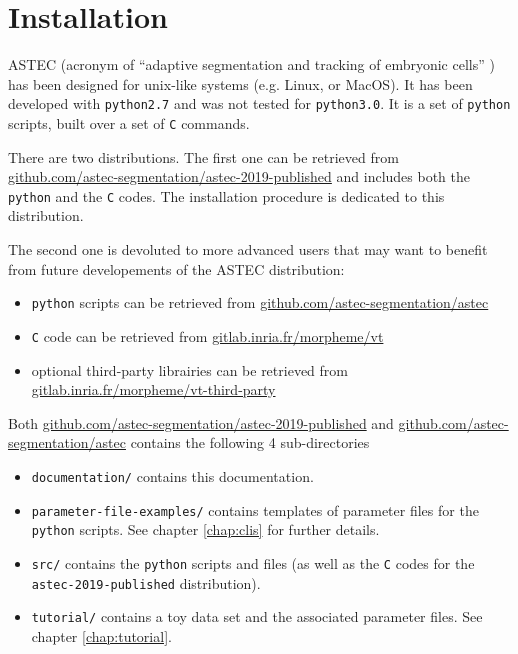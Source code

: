 
\chapter{Installation}

ASTEC (acronym of ``adaptive segmentation and tracking of embryonic
cells'' \cite{guignard:tel-01278725}) has been designed for unix-like
systems (e.g. Linux, or MacOS).
%
It has been developed with \texttt{python2.7} and was not tested for
\texttt{python3.0}.
%
It is a set of \texttt{python} scripts, built over a set of \texttt{C} commands.


There are two distributions. The first one can be retrieved from
\url{github.com/astec-segmentation/astec-2019-published} and includes
both the \texttt{python} and the \texttt{C} codes. The installation
procedure is dedicated to this distribution.

The second one is devoluted to more advanced users that may want to
benefit from future developements of the ASTEC distribution:
\begin{itemize}
\itemsep -1ex
\item \texttt{python} scripts can be retrieved from
  \url{github.com/astec-segmentation/astec}
\item \texttt{C} code can be retrieved from
  \url{gitlab.inria.fr/morpheme/vt}
\item optional third-party librairies can be retrieved from  \url{gitlab.inria.fr/morpheme/vt-third-party}
\end{itemize}  

Both \url{github.com/astec-segmentation/astec-2019-published} and
\url{github.com/astec-segmentation/astec} contains the following 4
sub-directories

\mbox{}
\mbox{}

\begin{itemize}
\itemsep -1ex
\item \texttt{documentation/} contains this documentation.
\item \texttt{parameter-file-examples/} contains templates of
  parameter files for the \texttt{python} scripts. See chapter
  \ref{chap:clis} for further details.
\item \texttt{src/} contains the \texttt{python} scripts and files (as
  well as the \texttt{C} codes for the \texttt{astec-2019-published} distribution).
\item \texttt{tutorial/} contains a toy data set and the associated
  parameter files. See chapter \ref{chap:tutorial}.
\end{itemize}  


